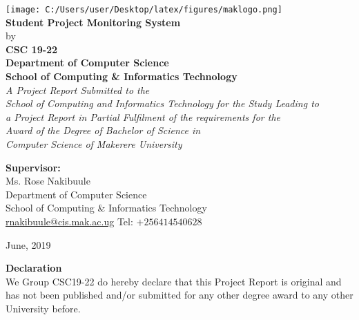 \documentclass{article}
\begin{document}
\begin{titlepage}

\begin{center}

\texttt{[image: C:/Users/user/Desktop/latex/figures/maklogo.png]}\\%
\vspace{1em}%
\Large \textbf {Student Project Monitoring System}\\%
\vspace{0.5em}%
\normalsize by \\%
\vspace{0.9em}
\textup{\small {\bf CSC 19-22}\\}
 \vspace{2em}%
{\bf Department of Computer Science \\ School of Computing \& Informatics Technology}\\[0.5in]

\emph{A Project Report Submitted to the \\School of Computing and Informatics Technology
for the Study Leading to\\ a Project Report in Partial Fulfilment of the
requirements for the\\ Award of the Degree of Bachelor of Science in \\Computer Science
of Makerere University}

      
        \vspace{1in}
\normalsize {\bf Supervisor:} \\

Ms. Rose Nakibuule \\
\vspace{2em}
Department of Computer Science\\
School of Computing \& Informatics Technology \\
\url{rnakibuule@cis.mak.ac.ug} Tel: $+256414540628$ 

\vfill
June, 2019

\end{center}

\end{titlepage}
\newpage
\textbf{Declaration}
\\We Group CSC19-22 do hereby declare that this Project Report is original and has not been published and/or submitted for any other degree award to any other University before.\\
\end{document}
